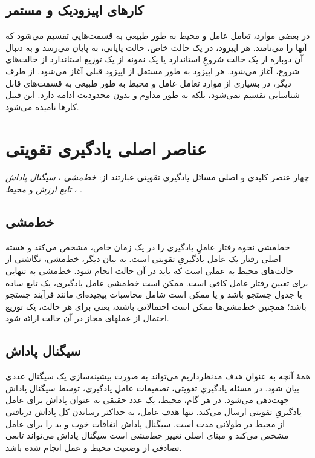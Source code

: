 \subsection{کارهای اپیزودیک و مستمر}
در بعضی موارد، تعامل عامل و محیط به طور طبیعی به قسمت‌هایی تقسیم می‌شود که آن\nf ها را 
\textit{}
می‌نامند. هر اپیزود، در یک حالت خاص، حالت پایانی، به پایان می‌رسد و به دنبال آن دوباره از یک حالت شروعِ استاندارد یا یک نمونه از یک توزیع استاندارد از حالت‌های شروع، آغاز می‌شود. هر اپیزود به طور مستقل از اپیزود قبلی آغاز می‌شود.
از طرف دیگر، در بسیاری از موارد تعامل عامل و محیط به طور طبیعی به قسمت‌های قابل شناسایی تقسیم نمی‌شود، بلکه به طور مداوم و بدون محدودیت ادامه دارد. این قبیل کارها 
\textit{
}
 نامیده می‌شود.


\section{عناصر اصلی یادگیری تقویتی}
چهار عنصر کلیدی و اصلی مسائل یادگیری تقویتی عبارتند از:
\textit{خط‌مشی} ، 
\textit{سیگنال پاداش} ،
\textit{تابع ارزش}  
و
\textit{محیط} .
\subsection{خط‌مشی}
خط‌مشی نحوه رفتار عاملِ یادگیری را در یک زمان خاص، مشخص می‌کند و هسته اصلی رفتار یک عامل یادگیریِ تقویتی است. به بیان دیگر، خط‌مشی، نگاشتی از حالت‌های محیط به عملی است که باید در آن حالت انجام شود. خط‌مشی به تنهایی برای تعیین رفتار عامل کافی است. ممکن است
خط‌مشی عامل یادگیری، یک تابع ساده یا جدول جستجو باشد و یا ممکن است شامل محاسبات پیچیده‌ای مانند فرآیند جستجو باشد؛ همچنین
خط‌مشی‌ها ممکن است احتمالاتی باشند، یعنی برای هر حالت، یک توزیع احتمال از عمل\nf های مجاز در آن حالت ارائه شود.


\subsection{سیگنال پاداش}

همهٔ آنچه به عنوان هدف مدنظرداریم می‌تواند به صورت بیشینه‌سازی  یک سیگنال عددی بیان شود. در مسئله یادگیریِ تقویتی، تصمیمات عاملِ یادگیری، توسط سیگنال پاداش جهت‌دهی می‌شود. در هر گام، محیط، یک عدد حقیقی به عنوان پاداش برای عامل یادگیریِ تقویتی ارسال می‌کند. تنها هدف عامل، به حداکثر رساندن کل پاداش دریافتی از محیط در طولانی مدت است. سیگنال پاداش اتفاقات خوب و بد را برای عامل مشخص می‌کند و مبنای اصلی تغییر خط‌مشی است
سیگنال پاداش می‌تواند تابعی تصادفی از وضعیت محیط و عمل انجام شده باشد.


